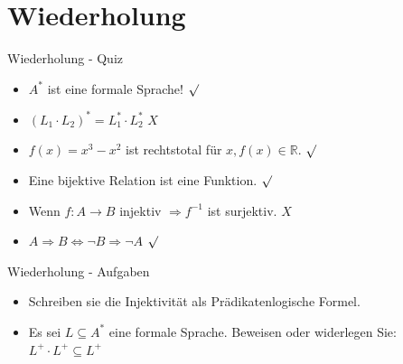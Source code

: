 	
	
	
	\section{Wiederholung} 
	\begin{frame} {Wiederholung - Quiz}
		\begin{itemize}
			\item $A^*$ ist eine formale Sprache! 
			\only<2-> {\color{darkgreen}$\surd$}\\
			\color{black}
			\item $(L_1 \cdot L_2)^* = L_1^* \cdot L_2^*$
			\only<3-> {\color{red}$X$}\\
			\color{black}
			\item $f(x) = x^3-x^2$ ist rechtstotal für $x, f(x) \in \mathbb{R}$.
			\only<4-> {\color{darkgreen}$\surd$}\\
			\color{black}
			\item Eine bijektive Relation ist eine Funktion.
			\only<5-> {\color{darkgreen}$\surd$}\\
			\color{black}
			\item Wenn $f: A \rightarrow B$ injektiv $\Rightarrow f^{-1}$ ist surjektiv.
			\only<6-> {\color{red}$X$}\\
			\color{black}
			\item $A\Rightarrow B \Leftrightarrow \neg B \Rightarrow \neg A$
			\only<7-> {\color{darkgreen}$\surd$}\\
		\end{itemize}
	\end{frame}
	
	
	
	\begin{frame} {Wiederholung - Aufgaben}
		\begin{itemize}
			\item Schreiben sie die Injektivität als Prädikatenlogische Formel.
			\pause
			\item Es sei $L \subseteq A^*$ eine formale Sprache. Beweisen oder widerlegen Sie:\\
			$L^+ \cdot L^+ \subseteq L^+$
		\end{itemize}
	\end{frame}
	
	
	
